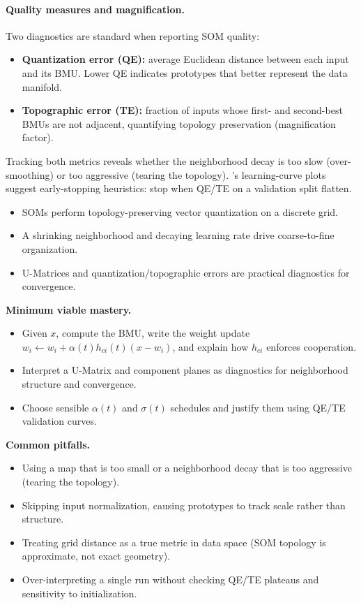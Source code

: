 \paragraph{Quality measures and magnification.} Two diagnostics are standard when reporting SOM quality:
\begin{itemize}
    \item \textbf{Quantization error (QE):} average Euclidean distance between each input and its BMU. Lower QE indicates prototypes that better represent the data manifold.
    \item \textbf{Topographic error (TE):} fraction of inputs whose first- and second-best BMUs are not adjacent, quantifying topology preservation (magnification factor).
\end{itemize}
Tracking both metrics reveals whether the neighborhood decay is too slow (over-smoothing) or too aggressive (tearing the topology). 's learning-curve plots suggest early\hyp{}stopping heuristics: stop when QE/TE on a validation split flatten.

\begin{tcolorbox}[summarybox, title={Key takeaways}]
\begin{itemize}
    \item SOMs perform topology-preserving vector quantization on a discrete grid.
    \item A shrinking neighborhood and decaying learning rate drive coarse-to-fine organization.
    \item U-Matrices and quantization/topographic errors are practical diagnostics for convergence.
\end{itemize}

\medskip
\noindent\textbf{Minimum viable mastery.}
\begin{itemize}
    \item Given \(x\), compute the BMU, write the weight update \(w_i \leftarrow w_i + \alpha(t) h_{ci}(t) (x-w_i)\), and explain how \(h_{ci}\) enforces cooperation.
    \item Interpret a U-Matrix and component planes as diagnostics for neighborhood structure and convergence.
    \item Choose sensible \(\alpha(t)\) and \(\sigma(t)\) schedules and justify them using QE/TE validation curves.
\end{itemize}

\noindent\textbf{Common pitfalls.}
\begin{itemize}
    \item Using a map that is too small or a neighborhood decay that is too aggressive (tearing the topology).
    \item Skipping input normalization, causing prototypes to track scale rather than structure.
    \item Treating grid distance as a true metric in data space (SOM topology is approximate, not exact geometry).
    \item Over-interpreting a single run without checking QE/TE plateaus and sensitivity to initialization.
\end{itemize}
\end{tcolorbox}

